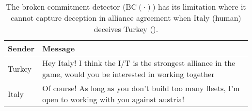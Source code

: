 \begin{table}[t]
    \centering
    \begin{tabular}{p{1.2cm}p{5.5cm}}
    \hline
    \textbf{Sender} & \textbf{Message}   \\ 
    \hline
     Turkey & \small{Hey Italy! I think the I/T is the strongest alliance in the game, would you be interested in working together} \\ 
    \rowcolor{grayish}  %
    Italy & \small{Of course! As long as you don't build too many fleets, I'm open to working with you against austria!} \\
    \hline
    \end{tabular}
    \caption{The broken commitment detector ($\text{BC}(\cdot)$) has its limitation where it cannot capture deception in alliance agreement when Italy (human) deceives Turkey (\cicero{}).}
    \label{fig:alliance}
\end{table}